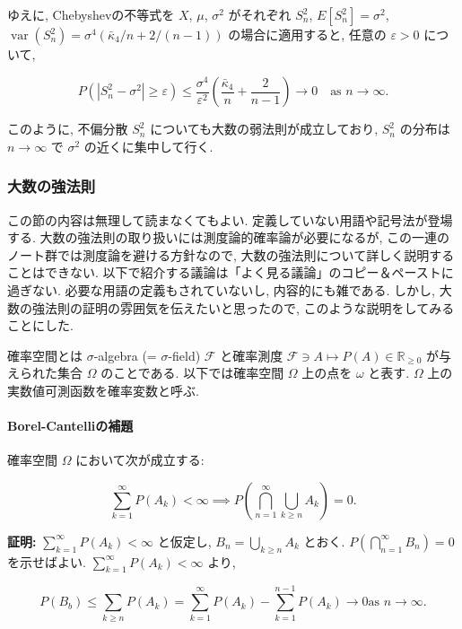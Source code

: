 \documentclass[
  letterpaper,
  DIV=11,
  numbers=noendperiod]{scrartcl}
\let\oldparagraph\paragraph
\renewcommand{\paragraph}[1]{\oldparagraph{#1}\mbox{}}
\begin{document}
ゆえに, Chebyshevの不等式を \(X\), \(\mu\), \(\sigma^2\) がそれぞれ
\(S_n^2\), \(E[S_n^2] = \sigma^2\),
\(\operatorname{var}(S_n^2) = \sigma^4(\bar\kappa_4/n+2/(n-1))\)
の場合に適用すると, 任意の \(\varepsilon>0\) について,

\[
P(|S_n^2 - \sigma^2| \ge \varepsilon) \le
\frac{\sigma^4}{\varepsilon^2}\left(\frac{\bar\kappa_4}{n} + \frac{2}{n-1}\right) \to 0
\quad\text{as $n\to\infty$}.
\]

このように, 不偏分散 \(S_n^2\) についても大数の弱法則が成立しており,
\(S_n^2\) の分布は \(n\to\infty\) で \(\sigma^2\) の近くに集中して行く.

\hypertarget{ux5927ux6570ux306eux5f37ux6cd5ux5247}{%
\subsubsection{大数の強法則}\label{ux5927ux6570ux306eux5f37ux6cd5ux5247}}

この節の内容は無理して読まなくてもよい.
定義していない用語や記号法が登場する.
大数の強法則の取り扱いには測度論的確率論が必要になるが,
この一連のノート群では測度論を避ける方針なので,
大数の強法則について詳しく説明することはできない.
以下で紹介する議論は「よく見る議論」のコピー＆ペーストに過ぎない.
必要な用語の定義もされていないし, 内容的にも雑である. しかし,
大数の強法則の証明の雰囲気を伝えたいと思ったので,
このような説明をしてみることにした.

確率空間とは \(\sigma\)-algebra (= \(\sigma\)-field) \(\mathscr{F}\)
と確率測度 \(\mathscr{F}\ni A\mapsto P(A)\in{\mathbb R}_{\ge 0}\)
が与えられた集合 \(\Omega\) のことである. 以下では確率空間 \(\Omega\)
上の点を \(\omega\) と表す. \(\Omega\)
上の実数値可測函数を確率変数と呼ぶ.

\hypertarget{borel-cantelliux306eux88dcux984c}{%
\paragraph{Borel-Cantelliの補題}\label{borel-cantelliux306eux88dcux984c}}

確率空間 \(\Omega\) において次が成立する:

\[
\sum_{k=1}^\infty P(A_k) < \infty \implies
P\left(\bigcap_{n=1}^\infty \bigcup_{k\ge n} A_k\right) = 0.
\]

\textbf{証明:} \(\sum_{k=1}^\infty P(A_k) < \infty\) と仮定し,
\(B_n = \bigcup_{k\ge n} A_k\) とおく.
\(P\left(\bigcap_{n=1}^\infty B_n\right) = 0\) を示せばよい.
\(\sum_{k=1}^\infty P(A_k) < \infty\) より,

\[
P(B_b) \le \sum_{k\ge n} P(A_k) =
\sum_{k=1}^\infty P(A_k) - \sum_{k=1}^{n-1} P(A_k) \to 0
\text{as $n\to\infty$}.
\]
\end{document}
